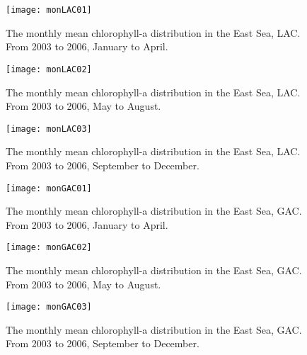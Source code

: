 \begin{figure}[h]
	\centering
	\texttt{[image: monLAC01]}\\
	\caption{The monthly mean chlorophyll-a distribution in the East Sea, LAC. From 2003 to 2006, January to April.}
	\label{fig:monLAC01}
\end{figure}


\begin{figure}[h]
	\centering
	\texttt{[image: monLAC02]}\\
	\caption{The monthly mean chlorophyll-a distribution in the East Sea, LAC. From 2003 to 2006, May to August.}
	\label{fig:monLAC02}
\end{figure}

\begin{figure}[h]
	\centering
	\texttt{[image: monLAC03]}\\
	\caption{The monthly mean chlorophyll-a distribution in the East Sea, LAC. From 2003 to 2006, September to December.}
	\label{fig:monLAC03}
\end{figure}


\begin{figure}[h]
	\centering
	\texttt{[image: monGAC01]}\\
	\caption{The monthly mean chlorophyll-a distribution in the East Sea, GAC. From 2003 to 2006, January to April.}
	\label{fig:monGAC01}
\end{figure}


\begin{figure}[h]
	\centering
	\texttt{[image: monGAC02]}\\
	\caption{The monthly mean chlorophyll-a distribution in the East Sea, GAC. From 2003 to 2006, May to August.}
	\label{fig:monGAC02}
\end{figure}


\begin{figure}[h]
	\centering
	\texttt{[image: monGAC03]}\\
	\caption{The monthly mean chlorophyll-a distribution in the East Sea, GAC. From 2003 to 2006, September to December.}
	\label{fig:monGAC03}
\end{figure}
